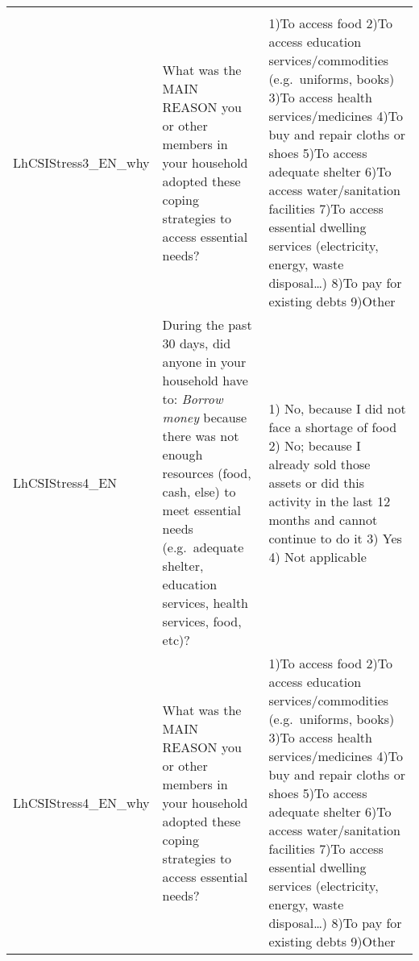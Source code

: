 \documentclass[
]{book}
\begin{document}
\begin{longtable}[]{@{}lll@{}}
\begin{minipage}[t]{0.43\columnwidth}
\end{minipage}\tabularnewline
\begin{minipage}[t]{0.11\columnwidth}\raggedright
LhCSIStress3\_EN\_why\strut
\end{minipage} & \begin{minipage}[t]{0.37\columnwidth}\raggedright
What was the MAIN REASON you or other members in your household adopted these coping strategies to access essential needs?\strut
\end{minipage} & \begin{minipage}[t]{0.43\columnwidth}\raggedright
1)To access food 2)To access education services/commodities (e.g.~uniforms, books) 3)To access health services/medicines 4)To buy and repair cloths or shoes 5)To access adequate shelter 6)To access water/sanitation facilities 7)To access essential dwelling services (electricity, energy, waste disposal\ldots) 8)To pay for existing debts 9)Other\strut
\end{minipage}\tabularnewline
\begin{minipage}[t]{0.11\columnwidth}\raggedright
LhCSIStress4\_EN\strut
\end{minipage} & \begin{minipage}[t]{0.37\columnwidth}\raggedright
During the past 30 days, did anyone in your household have to: \emph{Borrow money} because there was not enough resources (food, cash, else) to meet essential needs (e.g.~adequate shelter, education services, health services, food, etc)?\strut
\end{minipage} & \begin{minipage}[t]{0.43\columnwidth}\raggedright
1) No, because I did not face a shortage of food 2) No; because I already sold those assets or did this activity in the last 12 months and cannot continue to do it 3) Yes 4) Not applicable\strut
\end{minipage}\tabularnewline
\begin{minipage}[t]{0.11\columnwidth}\raggedright
LhCSIStress4\_EN\_why\strut
\end{minipage} & \begin{minipage}[t]{0.37\columnwidth}\raggedright
What was the MAIN REASON you or other members in your household adopted these coping strategies to access essential needs?\strut
\end{minipage} & \begin{minipage}[t]{0.43\columnwidth}\raggedright
1)To access food 2)To access education services/commodities (e.g.~uniforms, books) 3)To access health services/medicines 4)To buy and repair cloths or shoes 5)To access adequate shelter 6)To access water/sanitation facilities 7)To access essential dwelling services (electricity, energy, waste disposal\ldots) 8)To pay for existing debts 9)Other\strut

\end{minipage}
\end{longtable}
\end{document}
